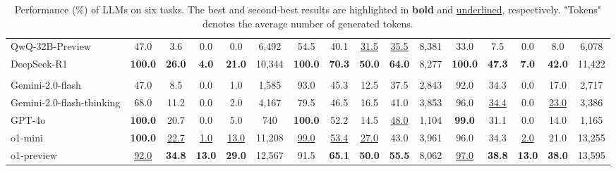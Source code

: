 \begin{table*}[!t]
{\begin{tabular}{l|ccccc|ccccc|ccccc}
        QwQ-32B-Preview & 47.0 & 3.6 & 0.0 & 0.0 & 6,492 & 54.5 & 40.1 & \underline{31.5} & \underline{35.5} & 8,381 & 33.0 & 7.5 & 0.0 & 8.0 & 6,078 \\
        DeepSeek-R1 & \textbf{100.0} & \textbf{26.0} & \textbf{4.0} & \textbf{21.0} & 10,344 & \textbf{100.0} & \textbf{70.3} & \textbf{50.0} & \textbf{64.0} & 8,277 & \textbf{100.0} & \textbf{47.3} & \textbf{7.0} & \textbf{42.0} & 11,422 \\
        \midrule
        \rowcolor{blue!15} \multicolumn{16}{l}{\textit{\textbf{Closed-source LLMs}}}\\
        \midrule
        Gemini-2.0-flash & 47.0 & 8.5 & 0.0 & 1.0 & 1,585 & 93.0 & 45.3 & 12.5 & 37.5 & 2,843 & 92.0 & 34.3 & 0.0 & 17.0 & 2,717 \\
        Gemini-2.0-flash-thinking & 68.0 & 11.2 & 0.0 & 2.0 & 4,167 & 79.5 & 46.5 & 16.5 & 41.0 & 3,853 & 96.0 & \underline{34.4} & 0.0 & \underline{23.0} & 3,386 \\
        GPT-4o & \textbf{100.0} & 20.7 & 0.0 & 5.0 & 740 & \textbf{100.0} & 52.2 & 14.5 & \underline{48.0} & 1,104 & \textbf{99.0} & 31.1 & 0.0 & 14.0 & 1,165 \\
        o1-mini & \textbf{100.0} & \underline{22.7} & \underline{1.0} & \underline{13.0} & 11,208 & \underline{99.0} & \underline{53.4} & \underline{27.0} & 43.0 & 3,961 & 96.0 & 34.3 & \underline{2.0} & 21.0 & 13,255 \\
        o1-preview & \underline{92.0} & \textbf{34.8} & \textbf{13.0} & \textbf{29.0} & 12,567 & 91.5 & \textbf{65.1} & \textbf{50.0} & \textbf{55.5} & 8,062 & \underline{97.0} & \textbf{38.8} & \textbf{13.0} & \textbf{38.0} & 13,595 \\ 
        \bottomrule
    \end{tabular}}    
    \caption{Performance (\%) of LLMs on six tasks. The best and second-best results are highlighted in \textbf{bold} and \underline{underlined}, respectively. "Tokens" denotes the average number of generated tokens.}
    \label{tab:main_exp}
\end{table*}